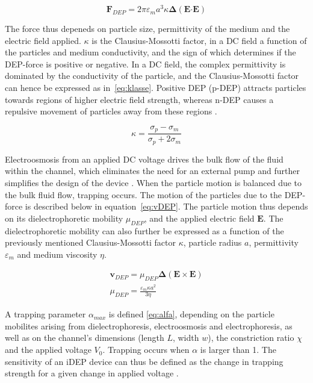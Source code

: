 \documentclass[journal, a4paper]{IEEEtran}
\begin{document}
\begin{equation}\label{eq:idepForce}
\mathbf{F}_{DEP}=2\pi\varepsilon _{m}a^{3}\kappa \boldsymbol{\Delta }\left (\boldsymbol{E}\boldsymbol{\cdot \boldsymbol{E}}  \right )
\end{equation}

The force thus depeneds on particle size, permittivity of the medium and the electric field applied. $\kappa$ is the Clausius-Mossotti factor, in a DC field a function of the particles and medium conductivity, and the sign of which determines if the DEP-force is positive or negative. In a DC field, the complex permittivity is dominated by the conductivity of the particle, and the Clausius-Mossotti factor can hence be expressed as in~\eqref{eq:klasse}. Positive DEP (p-DEP) attracts particles towards regions of higher electric field strength, whereas n-DEP causes a repulsive movement of particles away from these regions \cite{cheri2014}.

\begin{equation}\label{eq:klasse}
\kappa =\frac{\sigma _{p}-\sigma _{m}}{\sigma _{p}+2\sigma _{m}}
\end{equation}

Electroosmosis from an applied DC voltage drives the bulk flow of the fluid within the channel, which eliminates the need for an external pump and further simplifies the design of the device \cite{Braff:12}. When the particle motion is balanced due to the bulk fluid flow, trapping occurs. The motion of the particles due to the DEP-force is described below in equation~\eqref{eq:vDEP}. The particle motion thus depends on its dielectrophoretic mobility $\mu _{DEP}$, and the applied electric field $\boldsymbol{E}$. The dielectrophoretic mobility can also further be expressed as a function of the previously mentioned Clausius-Mossotti factor $\kappa$, particle radius $a$, permittivity $\varepsilon _{m}$ and medium viscosity $\eta$.

\begin{equation}\label{eq:vDEP}
\begin{matrix}
\boldsymbol{v}_{DEP}=\mu _{DEP}\boldsymbol{\Delta \left ( \boldsymbol{E}\times \boldsymbol{E} \right )}\\ 
\mu _{DEP}=\frac{\varepsilon _{m}\kappa a^{2}}{3\eta } 
\end{matrix}
\end{equation}

A trapping parameter $\alpha _{max}$ is defined \eqref{eq:alfa}, depending on the particle mobilites arising from dielectrophoresis, electroosmosis and electrophoresis, as well as on the channel's dimensions (length $L$, width $w$), the constriction ratio $\chi$ and the applied voltage $V_{0}$.  Trapping occurs when $\alpha$ is larger than 1. The sensitivity of an iDEP device can thus be defined as the change in trapping strength for a given change in applied voltage \cite{Braff:12}.
\end{document}
